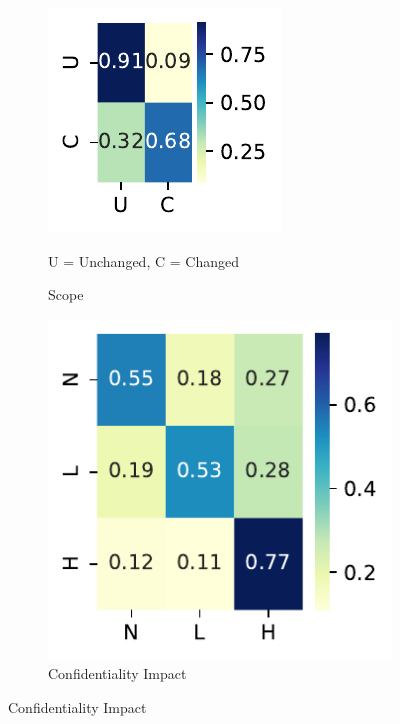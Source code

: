 \documentclass[12pt]{article}
\begin{document}
\begin{figure}
	\centering

	\vspace{1em}

	\begin{subfigure}[b]{0.45\textwidth}
		\includegraphics[width=\textwidth]{./figures/confusion_matrices/scope_nvd.pdf}
		\caption{Scope}

		\begin{tablenotes}
			\footnotesize
			\item \quad U = Unchanged, C = Changed
		\end{tablenotes}
	\end{subfigure}
	\hfill
	\begin{subfigure}[b]{0.45\textwidth}
		\includegraphics[width=\textwidth]{./figures/confusion_matrices/confidentiality_impact_nvd.pdf}
		\caption{Confidentiality Impact}


\end{subfigure}
\end{figure}
\end{document}
